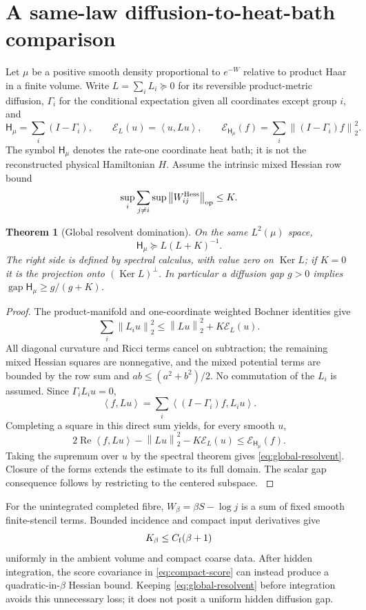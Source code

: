 \documentclass[11pt,oneside,openany]{book}
\newtheorem{theorem}{Theorem}[chapter]
\theoremstyle{definition}
\theoremstyle{remark}
\newcommand{\Ker}{\operatorname{Ker}}
\newcommand{\gap}{\operatorname{gap}}
\newcommand{\op}{\mathrm{op}}
\newcommand{\norm}[1]{\left\lVert#1\right\rVert}
\newcommand{\ip}[2]{\left\langle#1,#2\right\rangle}
\newcommand{\src}[2]{\cite[#2]{#1}}
\begin{document}
\section{A same-law diffusion-to-heat-bath comparison}
\label{sec:global-resolvent}
Let $\mu$ be a positive smooth density proportional to $e^{-W}$
relative to product Haar in a finite volume. Write
$L=\sum_iL_i\succeq0$ for its reversible product-metric diffusion,
$\Gamma_i$ for the conditional expectation given all coordinates
except group $i$, and
\[
 \mathsf H_\mu=\sum_i(I-\Gamma_i),\qquad
 \mathcal E_L(u)=\ip u{Lu},\qquad
 \mathcal E_{\mathsf H_\mu}(f)=\sum_i\norm{(I-\Gamma_i)f}_2^2.
\]
The symbol $\mathsf H_\mu$ denotes the rate-one coordinate heat bath;
it is not the reconstructed physical Hamiltonian $H$.
Assume the intrinsic mixed Hessian row bound
\[
 \sup_i\sum_{j\ne i}\sup\norm{W_{ij}^{\rm Hess}}_{\op}\le K.
\]

\begin{theorem}[Global resolvent domination]
\label{thm:global-resolvent}
On the same $L^2(\mu)$ space,
\begin{equation}\label{eq:global-resolvent}
 \mathsf H_\mu\succeq L(L+K)^{-1}.
\end{equation}
The right side is defined by spectral calculus, with value zero on
$\Ker L$; if $K=0$ it is the projection onto $(\Ker L)^\perp$.
In particular a diffusion gap $g>0$ implies
$\gap\mathsf H_\mu\ge g/(g+K)$.
\end{theorem}
\begin{proof}
The product-manifold and one-coordinate weighted Bochner identities
give
\[
 \sum_i\norm{L_iu}_2^2\le\norm{Lu}_2^2+K\mathcal E_L(u).
\]
All diagonal curvature and Ricci terms cancel on subtraction; the
remaining mixed Hessian squares are nonnegative, and the mixed
potential terms are bounded by the row sum and
$ab\le(a^2+b^2)/2$. No commutation of the $L_i$ is assumed.
Since $\Gamma_iL_iu=0$,
\[
 \ip f{Lu}=\sum_i\ip{(I-\Gamma_i)f}{L_i u}.
\]
Completing a square in this direct sum yields, for every smooth $u$,
\[
 2\operatorname{Re}\ip f{Lu}-\norm{Lu}_2^2-K\mathcal E_L(u)
             \le\mathcal E_{\mathsf H_\mu}(f).
\]
Taking the supremum over $u$ by the spectral theorem gives
\cref{eq:global-resolvent}. Closure of the forms extends the estimate
to its full domain. The scalar gap consequence follows by restricting
to the centered subspace. \src{F12}{V60, V77--V80}
\end{proof}
For the unintegrated completed fibre,
$W_\beta=\beta S-\log j$ is a sum of fixed smooth finite-stencil
terms. Bounded incidence and compact input derivatives give
\begin{equation}\label{eq:preintegrated-row}
 K_\beta\le C_{\rm f}(\beta+1)
\end{equation}
uniformly in the ambient volume and compact coarse data. After hidden
integration, the score covariance in \cref{eq:compact-score} can
instead produce a quadratic-in-$\beta$ Hessian bound. Keeping
\cref{eq:global-resolvent} before integration avoids this unnecessary
loss; it does not posit a uniform hidden diffusion gap.
\end{document}
